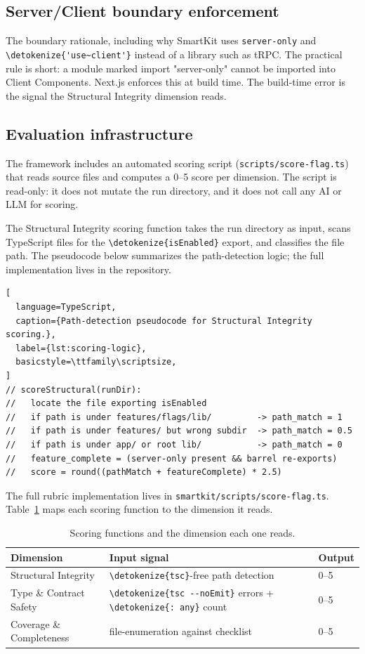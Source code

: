 \documentclass[12pt,a4paper]{report}
\newcommand{\code}[1]{\texttt{\nolinkurl{\detokenize{#1}}}}
\newcommand{\pkg}[1]{\texttt{\nolinkurl{#1}}}
\DeclareRobustCommand{\filename}[1]{\bgroup\urlstyle{tt}\nolinkurl{#1}\egroup}
\newcommand{\usec}{\code{'use~client'}}
\begin{document}
\subsection{Server/Client boundary enforcement}
\label{sec:server-client-boundary}

The boundary rationale, including why SmartKit uses \pkg{server-only} and \usec{} instead of a library such as tRPC. The practical rule is short: a module marked import "server-only" cannot be imported into Client Components. Next.js enforces this at build time. The build-time error is the signal the Structural Integrity dimension reads.

\subsection{Evaluation infrastructure}
\label{sec:eval-infrastructure}

The framework includes an automated scoring script (\filename{scripts/score-flag.ts}) that reads source files and computes a 0--5 score per dimension. The script is read-only: it does not mutate the run directory, and it does not call any AI or LLM for scoring.

The Structural Integrity scoring function takes the run directory as input, scans TypeScript files for the \code{isEnabled} export, and classifies the file path. The pseudocode below summarizes the path-detection logic; the full implementation lives in the repository.

\begin{lstlisting}[
  language=TypeScript,
  caption={Path-detection pseudocode for Structural Integrity scoring.},
  label={lst:scoring-logic},
  basicstyle=\ttfamily\scriptsize,
]
// scoreStructural(runDir):
//   locate the file exporting isEnabled
//   if path is under features/flags/lib/         -> path_match = 1
//   if path is under features/ but wrong subdir  -> path_match = 0.5
//   if path is under app/ or root lib/           -> path_match = 0
//   feature_complete = (server-only present && barrel re-exports)
//   score = round((pathMatch + featureComplete) * 2.5)
\end{lstlisting}

The full rubric implementation lives in \filename{smartkit/scripts/score-flag.ts}. Table~\ref{tbl:scoring-summary} maps each scoring function to the dimension it reads.

\begin{table}[H]
  \centering
  \small
  \caption{Scoring functions and the dimension each one reads.}
  \label{tbl:scoring-summary}
  \begin{tabular}{lll}
    \hline
    \textbf{Dimension} & \textbf{Input signal} & \textbf{Output} \\
    \hline
    Structural Integrity & \code{tsc}-free path detection & 0--5 \\
    Type \& Contract Safety & \code{tsc --noEmit} errors + \code{: any} count & 0--5 \\
    Coverage \& Completeness & file-enumeration against checklist & 0--5 \\
    \hline
  \end{tabular}
\end{table}
\end{document}
